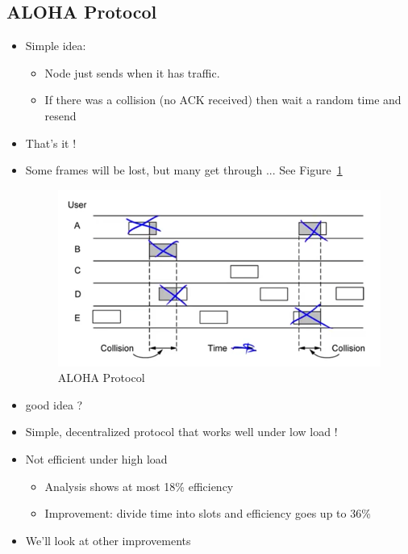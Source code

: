 \documentclass[12pt]{ctexart}   %
\begin{document}
	\subsection{ALOHA Protocol}
	\begin{itemize}
		\item Simple idea:
		\begin{itemize}
			\item Node just sends when it has traffic.
			\item If there was a collision (no ACK received) then wait a random time and resend
		\end{itemize}
		
		\item That's it !
		
		\item Some frames will be lost, but many get through ... See Figure~\ref{fig:3-4-2} 
		\begin{figure}[h!] %
		\centering
		 \includegraphics[scale=0.7]{images/3-4-2}
		\caption{ ALOHA Protocol}
		 \label{fig:3-4-2}
		 \end{figure}
		 
		 \item good idea ?
		 
		 \item Simple, decentralized protocol that works well under low load !
		 \item Not efficient under high load
		 \begin{itemize}
		 	\item Analysis shows at most 18\% efficiency
		 	\item Improvement: divide time into slots and efficiency goes up to 36\%
		 \end{itemize}
		 
		 \item We'll look at other improvements
	\end{itemize}
\end{document}
